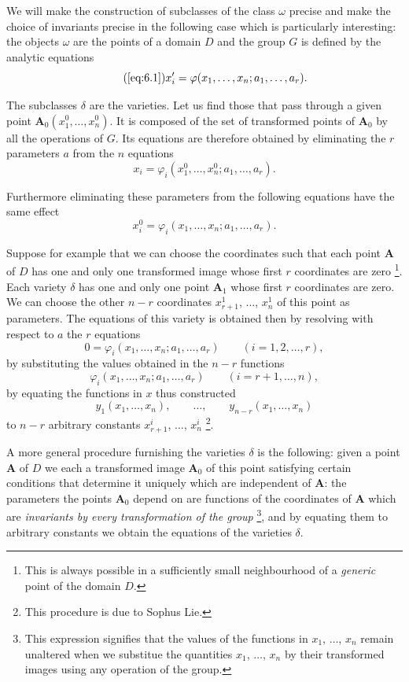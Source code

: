 \documentclass[leqno,11pt]{book}
\makeatletter
\numberwithin{equation}{chapter}
\theoremstyle{shape1}
\theoremstyle{shapesmall}
\let\old@phi\phi
\let\old@varphi\varphi
\let\phi\old@varphi
\let\varphi\old@phi
\newcommand{\somespace}{\vspace{9pt}}
\makeatother
\begin{document}
\somespace
{\small
We will make the construction of subclasses of the class $\omega$ precise and make the choice of invariants precise in the following case which is particularly interesting: the objects $\omega$ are the points of a domain $D$ and the group $G$ is defined by the analytic equations
\begin{equation}
  \label{eq:6.1a}\tag{\ref{eq:6.1}}
  x'_{i}=\phi(x_{1},\dots,x_{n};a_{1},\dots,a_{r}).
\end{equation}

The subclasses $\delta$ are the varieties. Let us find those that pass through a given point $\mathbf{A}_{0}(x^{0}_{1},\dots,x^{0}_{n})$. It is composed of the set of transformed points of $\mathbf{A}_{0}$ by all the operations of $G$. Its equations are therefore obtained by eliminating the $r$ parameters $a$ from the $n$ equations
\[
x_{i}=\phi_{i}(x^{0}_{1},\dots,x^{0}_{n};a_{1},\dots,a_{r}).
\]

Furthermore eliminating these parameters from the following equations have the same effect
\[
x^{0}_{i}=\phi_{i}(x_{1},\dots,x_{n};a_{1},\dots,a_{r}).
\]

Suppose for example that we can choose the coordinates such that each point $\mathbf{A}$ of $D$ has one and only one transformed image whose first $r$ coordinates are zero \footnote{This is always possible in a sufficiently small neighbourhood of a \emph{generic} point of the domain $D$.}. Each variety $\delta$ has one and only one point $\mathbf{A}_{1}$ whose first $r$ coordinates are zero. We can choose the other $n-r$ coordinates $x^{1}_{r+1}$, $\dots$, $x^{1}_{n}$ of this point as parameters. The equations of this variety is obtained then by resolving with respect to $a$ the $r$ equations
\[
0=\phi_{i}(x_{1},\dots,x_{n};a_{1},\dots,a_{r})\qquad (i=1,2,\dots,r),
\]
by substituting the values obtained in the $n-r$ functions
\[
\phi_{i}(x_{1},\dots,x_{n};a_{1},\dots,a_{r})\qquad (i=r+1,\dots,n),
\]
by equating the functions in $x$ thus constructed
\[
y_{1}(x_{1},\dots,x_{n}),\qquad \dots,\qquad y_{n-r}(x_{1},\dots,x_{n})
\]
to $n-r$ arbitrary constants $x^{i}_{r+1}$, $\dots$, $x^{i}_{n}$ \footnote{This procedure is due to Sophus Lie.}.

A more general procedure furnishing the varieties $\delta$ is the following: given a point $\mathbf{A}$ of $D$ we each a transformed image $\mathbf{A}_{0}$ of this point satisfying certain conditions that determine it uniquely which are independent of $\mathbf{A}$: the parameters the points $\mathbf{A}_{0}$ depend on are functions of the coordinates of $\mathbf{A}$ which are \emph{invariants by every transformation of the group} \footnote{This expression signifies that the values of the functions in $x_{1}$, $\dots$, $x_{n}$ remain unaltered when we substitue the quantities $x_{1}$, $\dots$, $x_{n}$ by their transformed images using any operation of the group.}, and by equating them to arbitrary constants we obtain the equations of the varieties $\delta$.
}
\end{document}
